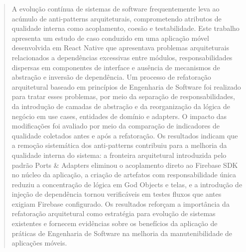 \documentclass[sigconf,anonymous]{acmart}
\begin{document}
\begin{abstract}
A evolução contínua de sistemas de software frequentemente leva ao acúmulo de anti-patterns arquiteturais, comprometendo atributos de qualidade interna como acoplamento, coesão e testabilidade. Este trabalho apresenta um estudo de caso conduzido em uma aplicação móvel desenvolvida em React Native que apresentava problemas arquiteturais relacionados a dependências excessivas entre módulos, responsabilidades dispersas em componentes de interface e ausência de mecanismos de abstração e inversão de dependência. Um processo de refatoração arquitetural baseado em princípios de Engenharia de Software foi realizado para tratar esses problemas, por meio da separação de responsabilidades, da introdução de camadas de abstração e da reorganização da lógica de negócio em use cases, entidades de domínio e adapters. O impacto das modificações foi avaliado por meio da comparação de indicadores de qualidade coletados antes e após a refatoração. Os resultados indicam que a remoção sistemática dos anti-patterns contribuiu para a melhoria da qualidade interna do sistema: a fronteira arquitetural introduzida pelo padrão Ports \& Adapters eliminou o acoplamento direto ao Firebase SDK no núcleo da aplicação, a criação de artefatos com responsabilidade única reduziu a concentração de lógica em God Objects e telas, e a introdução de injeção de dependência tornou verificáveis em testes fluxos que antes exigiam Firebase configurado. Os resultados reforçam a importância da refatoração arquitetural como estratégia para evolução de sistemas existentes e fornecem evidências sobre os benefícios da aplicação de práticas de Engenharia de Software na melhoria da manutenibilidade de aplicações móveis.
\end{abstract}


\frenchspacing
\maketitle
\end{document}
